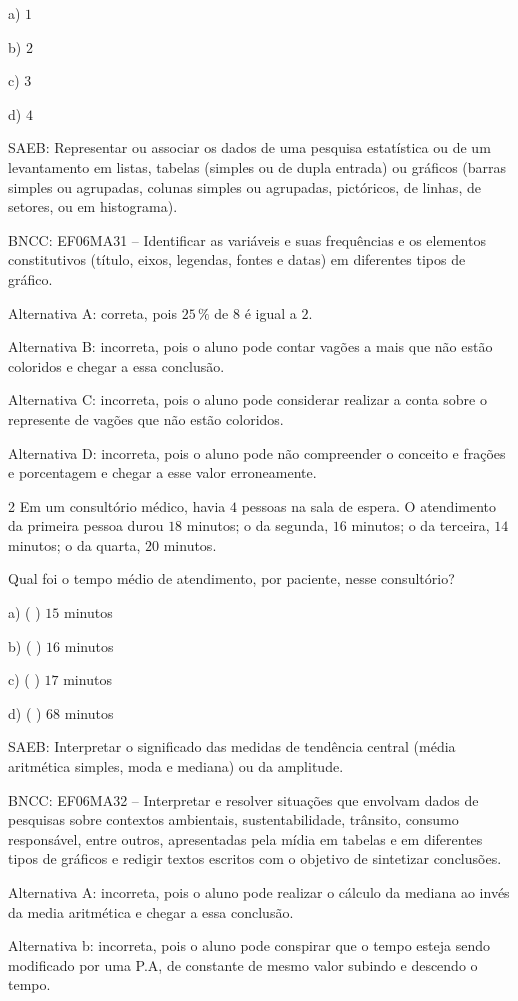 a) $1$

b) $2$

c) $3$

d) $4$

SAEB: Representar ou associar os dados de uma pesquisa estatística ou de
um levantamento em listas, tabelas (simples ou de dupla entrada) ou
gráficos (barras simples ou agrupadas, colunas simples ou agrupadas,
pictóricos, de linhas, de setores, ou em histograma).

BNCC: EF06MA31 -- Identificar as variáveis e suas frequências e os
elementos constitutivos (título, eixos, legendas, fontes e datas) em
diferentes tipos de gráfico.

Alternativa A: correta, pois $25\,\%$ de $8$ é igual a $2$.

Alternativa B: incorreta, pois o aluno pode contar vagões a mais que não
estão coloridos e chegar a essa conclusão.

Alternativa C: incorreta, pois o aluno pode considerar realizar a conta
sobre o represente de vagões que não estão coloridos.

Alternativa D: incorreta, pois o aluno pode não compreender o conceito e
frações e porcentagem e chegar a esse valor erroneamente.

\num{2}  Em um consultório médico, havia $4$ pessoas na sala de espera. O
atendimento da primeira pessoa durou $18$ minutos; o da segunda, $16$
minutos; o da terceira, $14$ minutos; o da quarta, $20$ minutos.

Qual foi o tempo médio de atendimento, por paciente, nesse consultório?

a) ( ) $15$ minutos

b) ( ) $16$ minutos

c) ( ) $17$ minutos

d) ( ) $68$ minutos

SAEB: Interpretar o significado das medidas de tendência central (média
aritmética simples, moda e mediana) ou da amplitude.

BNCC: EF06MA32 -- Interpretar e resolver situações que envolvam dados de
pesquisas sobre contextos ambientais, sustentabilidade, trânsito,
consumo responsável, entre outros, apresentadas pela mídia em tabelas e
em diferentes tipos de gráficos e redigir textos escritos com o objetivo
de sintetizar conclusões.

Alternativa A: incorreta, pois o aluno pode realizar o cálculo da
mediana ao invés da media aritmética e chegar a essa conclusão.

Alternativa b: incorreta, pois o aluno pode conspirar que o tempo esteja
sendo modificado por uma P.A, de constante de mesmo valor subindo e
descendo o tempo.

